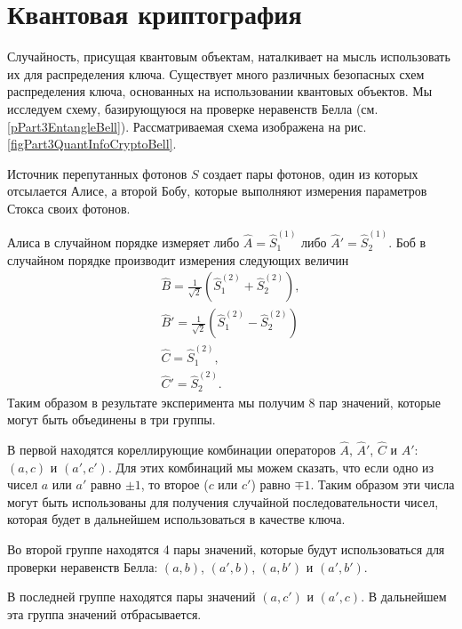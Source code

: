 \section{Квантовая криптография}
\label{subsecPart3QuantInfoQuantCrypto}
Случайность, присущая квантовым объектам, наталкивает на мысль
использовать их для распределения ключа. Существует много различных
безопасных схем распределения ключа, основанных на использовании
квантовых объектов. Мы исследуем схему, базирующуюся на проверке
неравенств Белла (см. \ref{pPart3EntangleBell}). Рассматриваемая схема
изображена на рис. \ref{figPart3QuantInfoCryptoBell}.



Источник перепутанных фотонов $S$ создает пары фотонов,
один из которых отсылается Алисе, а второй Бобу, которые выполняют
измерения параметров Стокса своих фотонов. 

Алиса в случайном порядке измеряет либо $\hat{A} = \hat{S}_1^{(1)}$
либо $\hat{A}' = \hat{S}_2^{(1)}$. Боб в случайном порядке производит
измерения следующих величин 
\begin{eqnarray}
\hat{B} = \frac{1}{\sqrt{2}}\left(\hat{S}_1^{(2)} +
  \hat{S}_2^{(2)}\right), 
\nonumber \\
\hat{B}' = \frac{1}{\sqrt{2}}\left(\hat{S}_1^{(2)} - \hat{S}_2^{(2)}\right)
\nonumber \\
\hat{C} = \hat{S}_1^{(2)},
\nonumber \\
\hat{C}' = \hat{S}_2^{(2)}.
\nonumber
\end{eqnarray}
Таким образом в результате эксперимента мы получим 8 пар значений,
которые могут быть объединены в три группы. 

В первой находятся
кореллирующие комбинации операторов $\hat{A}$, $\hat{A}'$, $\hat{C}$ и
$\hat{A}'$: $\left(a, c\right)$ и $\left(a', c'\right)$. Для этих
комбинаций мы можем сказать, что если одно из чисел $a$ или $a'$
равно $\pm 1$, то второе ($c$ или $c'$) равно $\mp 1$. Таким образом
эти числа могут быть использованы для получения случайной
последовательности чисел, которая будет в дальнейшем использоваться в
качестве ключа. 

Во второй группе находятся 4 пары значений, которые будут
использоваться для проверки неравенств Белла: $\left(a, b\right)$,
$\left(a', b\right)$, $\left(a, b'\right)$ и $\left(a', b'\right)$.

В последней группе находятся пары значений $\left(a, c'\right)$ и
$\left(a', c\right)$. В дальнейшем эта группа значений отбрасывается.


